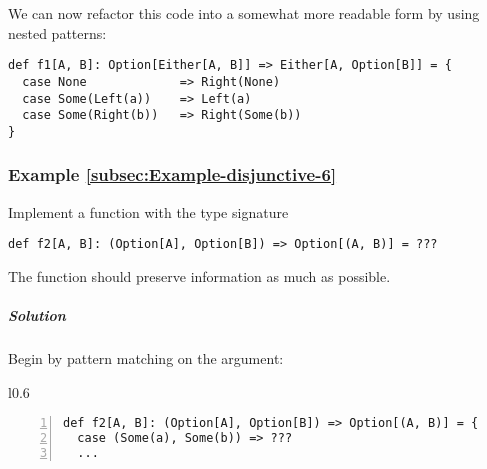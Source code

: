 We can now refactor this code into a somewhat more readable form by
using nested patterns: 
\begin{lstlisting}
def f1[A, B]: Option[Either[A, B]] => Either[A, Option[B]] = {
  case None             => Right(None)
  case Some(Left(a))    => Left(a)
  case Some(Right(b))   => Right(Some(b))
}
\end{lstlisting}


\subsubsection{Example \label{subsec:Example-disjunctive-6}\ref{subsec:Example-disjunctive-6}}

Implement a function with the type signature 
\begin{lstlisting}
def f2[A, B]: (Option[A], Option[B]) => Option[(A, B)] = ???
\end{lstlisting}
The function should preserve information as much as possible.

\subparagraph{Solution}

Begin by pattern matching on the argument:

\begin{wrapfigure}{l}{0.6\columnwidth}%
\vspace{-0.6\baselineskip}
\begin{lstlisting}[numbers=left,numberstyle={\small}]
def f2[A, B]: (Option[A], Option[B]) => Option[(A, B)] = {
  case (Some(a), Some(b)) => ???
  ...
\end{lstlisting}

\vspace{-0.8\baselineskip}
\end{wrapfigure}%

